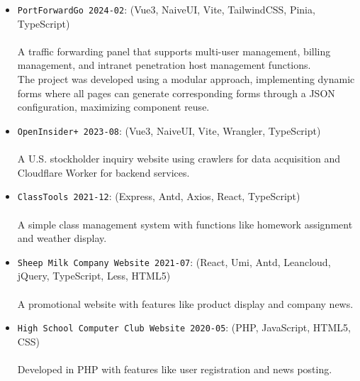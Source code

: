 \documentclass{resume}
\begin{document}
\begin{itemize}
  \item \texttt{PortForwardGo 2024-02}:
    (Vue3, NaiveUI, Vite, TailwindCSS, Pinia, TypeScript)\\
    \\
    A traffic forwarding panel that supports multi-user management, billing management,
    and intranet penetration host management functions.\\
    The project was developed using a modular approach,
    implementing dynamic forms where all pages can generate corresponding forms through a JSON configuration,
    maximizing component reuse.\\
  \item \texttt{OpenInsider+ 2023-08}:
    (Vue3, NaiveUI, Vite, Wrangler, TypeScript)\\
    \\
    A U.S. stockholder inquiry website using crawlers for data acquisition and Cloudflare Worker for backend services.\\
  \item \texttt{ClassTools 2021-12}:
    (Express, Antd, Axios, React, TypeScript)\\
    \\
    A simple class management system with functions like homework assignment and weather display.\\
  \item \texttt{Sheep Milk Company Website 2021-07}:
    (React, Umi, Antd, Leancloud, jQuery, TypeScript, Less, HTML5)\\
    \\
    A promotional website with features like product display and company news.\\
  \item \texttt{High School Computer Club Website 2020-05}:
    (PHP, JavaScript, HTML5, CSS)\\
    \\
    Developed in PHP with features like user registration and news posting.
\end{itemize}
\end{document}

